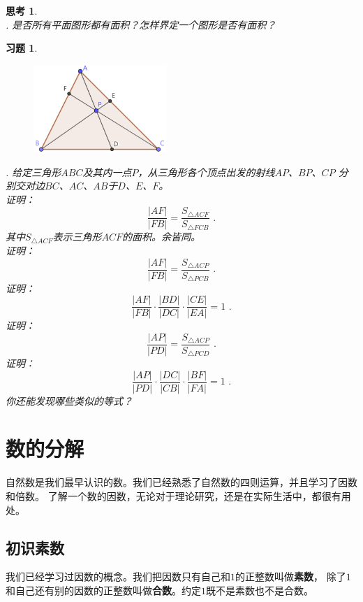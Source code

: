 \documentclass[12pt,UTF8]{ctexbook}
\newtheorem{sk}{思考}[section]
\newtheorem{xt}{习题}[section]
\begin{document}
\begin{sk}
    \mbox{} \\
    . 是否所有平面图形都有面积？怎样界定一个图形是否有面积？
\end{sk}

\begin{xt}
    \mbox{} \\

    \begin{figure}[H] 
        \vspace{4pt}
        \centering
        \includegraphics[width=0.45\textwidth]{tu/塞瓦定理1.png}
    \end{figure}

    . 给定三角形$ABC$及其内一点$P$，从三角形各个顶点出发的射线$AP$、$BP$、$CP$
    分别交对边$BC$、$AC$、$AB$于$D$、$E$、$F$。\\
     证明：
    $$ \frac{|AF|}{|FB|} = \frac{S_{\triangle ACF}}{S_{\triangle FCB}}\,\,.$$
    \indent 其中$S_{\triangle ACF}$表示三角形$ACF$的面积。余皆同。\\
     证明：
    $$ \frac{|AF|}{|FB|} = \frac{S_{\triangle ACP}}{S_{\triangle PCB}}\,\,.$$
     证明：
    $$ \frac{|AF|}{|FB|} \cdot \frac{|BD|}{|DC|} \cdot \frac{|CE|}{|EA|} = 1\,\,.$$
     证明：
    $$ \frac{|AP|}{|PD|} = \frac{S_{\triangle ACP}}{S_{\triangle PCD}}\,\,.$$
     证明：
    $$ \frac{|AP|}{|PD|} \cdot \frac{|DC|}{|CB|} \cdot \frac{|BF|}{|FA|} = 1\,\,.$$
     你还能发现哪些类似的等式？
\end{xt}


\chapter{数的分解}
自然数是我们最早认识的数。我们已经熟悉了自然数的四则运算，并且学习了因数和倍数。
了解一个数的因数，无论对于理论研究，还是在实际生活中，都很有用处。
\section{初识素数}
我们已经学习过因数的概念。我们把因数只有自己和$1$的正整数叫做\textbf{素数}，
除了$1$和自己还有别的因数的正整数叫做\textbf{合数}。约定$1$既不是素数也不是合数。
\end{document}
